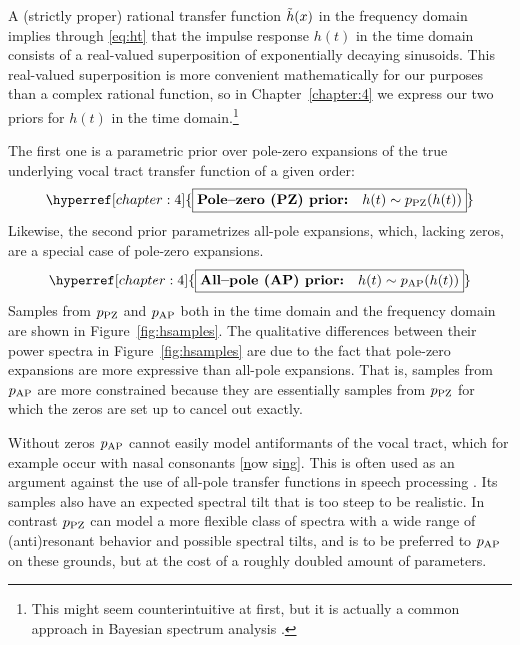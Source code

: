 \begin{chaptersections}

A (strictly proper) rational transfer function $\tilde{h}(x)$ in the frequency domain implies through \eqref{eq:ht} that the impulse response $h(t)$ in the time domain consists of a real-valued superposition of exponentially decaying sinusoids.
This real-valued superposition is more convenient mathematically for our purposes than a complex rational function, so in Chapter~\ref{chapter:4} we express our two priors for $h(t)$ in the time domain.\footnote{%
This might seem counterintuitive at first, but it is actually a common approach in Bayesian spectrum analysis \citep{Bretthorst1988,Turner2014}.
}

The first one is a parametric prior over pole-zero expansions of the true underlying vocal tract transfer function of a given order:
\begin{equation}
	\hyperref[chapter:4]{\boxed{\textbf{Pole--zero (PZ) prior:} \quad h(t) \sim \piPZ(h(t))}} \label{eq:pzprior}
\end{equation}
Likewise, the second prior parametrizes all-pole expansions, which, lacking zeros, are a special case of pole-zero expansions.
\begin{equation}
\hyperref[chapter:4]{\boxed{\textbf{All--pole (AP) prior:} \quad h(t) \sim \piAP(h(t))}} \label{eq:apprior}
\end{equation}
Samples from $p_{\text{PZ}}$ and $p_{\text{AP}}$ both in the time domain and the frequency domain are shown in Figure~\ref{fig:hsamples}.
The qualitative differences between their power spectra in Figure~\ref{fig:hsamples} are due to the fact that pole-zero expansions are more expressive than all-pole expansions.
That is, samples from $p_{\text{AP}}$ are more constrained because they are essentially samples from $p_{\text{PZ}}$ for which the zeros are set up to cancel out exactly.

Without zeros $p_{\text{AP}}$ cannot easily model antiformants of the vocal tract, which for example occur with nasal consonants [\underline{n}ow si\underline{ng}].
This is often used as an argument against the use of all-pole transfer functions in speech processing \citep[for example][]{Mehta2012}.
Its samples also have an expected spectral tilt that is too steep to be realistic.
In contrast $p_{\text{PZ}}$ can model a more flexible class of spectra with a wide range of (anti)resonant behavior and possible spectral tilts, and is to be preferred to $p_{\text{AP}}$ on these grounds, but at the cost of a roughly doubled amount of parameters.


\end{chaptersections}
